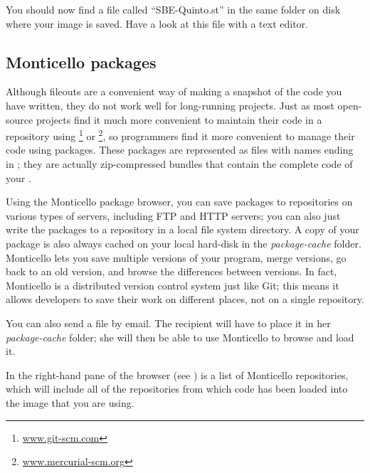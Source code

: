 \documentclass[a4paper,10pt,twoside]{book}
\begin{document}
You should now find a file called ``SBE-Quinto.st'' in the same folder on disk where your image is saved.
Have a look at this file with a text editor.


\subsection{Monticello packages}
Although fileouts are a convenient way of making a snapshot of the code you have written, they do not work well for long-running projects.
Just as most open-source projects find it much more convenient to maintain their code in a repository using \footnote{\url{www.git-scm.com}} or \footnote{\url{www.mercurial-scm.org}}, so \squeak programmers find it more convenient to manage their code using  packages.
These packages are represented as files with names ending in ; they are actually zip-compressed bundles that contain the complete code of your .

Using the Monticello package browser, you can save packages to repositories on various types of servers, including FTP and HTTP servers; you can also just write the packages to a repository in a local file system directory.
A copy of your package is also always cached on your local hard-disk in the \emph{package-cache} folder.
Monticello lets you save multiple versions of your program, merge versions, go back to an old version, and browse the differences between versions.
In fact, Monticello is a distributed version control system just like Git; this means it allows developers to save their work on different places, not on a single repository.

You can also send a  file by email.
The recipient will have to place it in her \emph{package-cache} folder; she will then be able to use Monticello to browse and load it.

In the right-hand pane of the browser (see ) is a list of Monticello repositories, which will include all of the repositories from which code has been loaded into the image that you are using.
\end{document}
